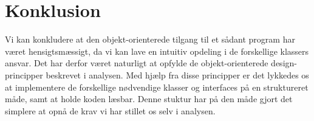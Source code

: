 \section{Konklusion}
Vi kan konkludere at den objekt-orienterede tilgang til et sådant program har været hensigtsmæssigt, da vi kan lave en intuitiv opdeling i de forskellige klassers ansvar. Det har derfor været naturligt at opfylde de objekt-orienterede design-principper beskrevet i analysen. Med hjælp fra disse principper er det lykkedes os at implementere de forskellige nødvendige klasser og interfaces på en struktureret måde, samt at holde koden læsbar. Denne stuktur har på den måde gjort det simplere at opnå de krav vi har stillet os selv i analysen. 
